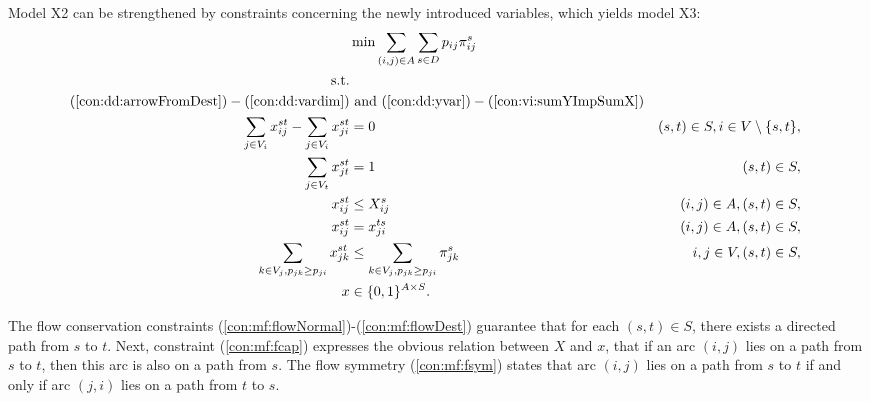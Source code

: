 Model X2 can be strengthened by constraints concerning the newly introduced variables, which yields model X3: 
\newline
\newline
\begin{subequations}[resume]\label{eq:smt-x2}
\begin{align}
\notag\makebox[0pt][l]{$\displaystyle{} \min \sum\limits_{(i,j) \in A} \sum\limits_{s \in D} p_{ij} \pi^s_{ij} $}\\
\text{s.t.} \notag \\
(\ref{con:dd:arrowFromDest}) - (\ref{con:dd:vardim}) &\text{ and }(\ref{con:dd:yvar}) - (\ref{con:vi:sumYImpSumX}) \notag\\
\label{con:mf:flowNormal} \sum\limits_{\substack{ j\in V_i}}x^{st}_{ij}-\sum\limits_{\substack{j\in V_i }}x^{st}_{ji} & = 0 & (s,t)\in S, i\in V\setminus\{s,t\},\\
\label{con:mf:flowDest} \sum\limits_{\substack{j\in V_t}}x^{st}_{jt}    & = 1  & (s,t)\in S,\\
\label{con:mf:fcap} x^{st}_{ij} &\leq X^{s}_{ij}& (i,j)\in A, (s,t)\in S,\\
\label{con:mf:fsym} x^{st}_{ij} &=  x^{ts}_{ji}& (i,j)\in A, (s,t)\in S,\\ 
\label{con:vi:sumFImpSumY} \sum\limits_{k\in V_j, p_{jk}\geq p_{ji}}x^{st}_{jk} & \leq \sum\limits_{k\in V_j, p_{jk}\geq p_{ji}}  \pi^{s}_{jk} & i,j\in V, (s,t)\in S,\\
\label{con:mf:xydim} x&\in\{0,1\}^{A\times S}. 
\end{align}~
\end{subequations}

The flow conservation constraints (\ref{con:mf:flowNormal})-(\ref{con:mf:flowDest}) guarantee that for each $(s,t)\in S$, there exists a directed path from $s$ to $t$.
Next, constraint (\ref{con:mf:fcap}) expresses the obvious relation between $X$ and $x$, that if an arc $(i,j)$ lies on a path from $s$ to $t$, then this arc is also on a path from $s$.
The flow symmetry (\ref{con:mf:fsym}) states that arc $(i,j)$ lies on a path from $s$ to $t$ if and only if arc $(j,i)$ lies on a path from $t$ to $s$.

